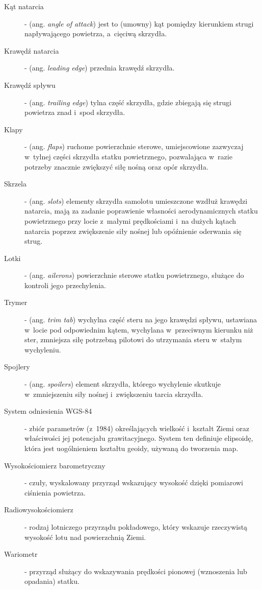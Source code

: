 \documentclass{mwrep}
\begin{document}
\begin{description}
\item[Kąt natarcia] - (ang. \emph{angle of attack}) jest to (umowny) kąt pomiędzy kierunkiem strugi napływającego powietrza, a~cięciwą skrzydła.
\item[Krawędź natarcia] - (ang. \emph{leading edge}) przednia krawędź skrzydła.
\item[Krawędź spływu] - (ang. \emph{trailing edge}) tylna część skrzydła, gdzie zbiegają się strugi powietrza znad i~spod skrzydła.
\item[Klapy] - (ang. \emph{flaps}) ruchome powierzchnie sterowe, umiejscowione zazwyczaj w~tylnej części skrzydła statku powietrznego, pozwalająca w~razie potrzeby znacznie zwiększyć siłę nośną oraz opór skrzydła.
\item[Skrzela] - (ang. \emph{slots}) elementy skrzydła samolotu umieszczone wzdłuż krawędzi natarcia, mają za zadanie poprawienie własności aerodynamicznych statku powietrznego przy locie z~małymi prędkościami i~na dużych kątach natarcia poprzez zwiększenie siły nośnej lub opóźnienie oderwania się strug.
\item[Lotki] - (ang. \emph{ailerons}) powierzchnie sterowe statku powietrznego, służące do kontroli jego przechylenia.
\item[Trymer] - (ang. \emph{trim tab}) wychylna część steru na jego krawędzi spływu, ustawiana w~locie pod odpowiednim kątem, wychylana w~przeciwnym kierunku niż ster, zmniejsza siłę potrzebną pilotowi do utrzymania steru w~stałym wychyleniu.
\item[Spojlery] - (ang. \emph{spoilers}) element skrzydła, którego wychylenie skutkuje w~zmniejszeniu siły nośnej i~zwiększeniu tarcia skrzydła.
\item[System odniesienia WGS-84] - zbiór parametrów (z~1984) określających wielkość i~kształt Ziemi oraz właściwości jej potencjału grawitacyjnego. System ten definiuje elipsoidę, która jest uogólnieniem kształtu geoidy, używaną do tworzenia map.
\item[Wysokościomierz barometryczny] - czuły, wyskalowany przyrząd \linebreak wskazujący wysokość dzięki pomiarowi ciśnienia powietrza.
\item[Radiowysokościomierz] - rodzaj lotniczego przyrządu pokładowego, \linebreak który wskazuje rzeczywistą wysokość lotu nad powierzchnią Ziemi.
\item[Wariometr] - przyrząd służący do wskazywania prędkości pionowej \linebreak (wznoszenia lub opadania) statku.

\end{description}
\end{document}
